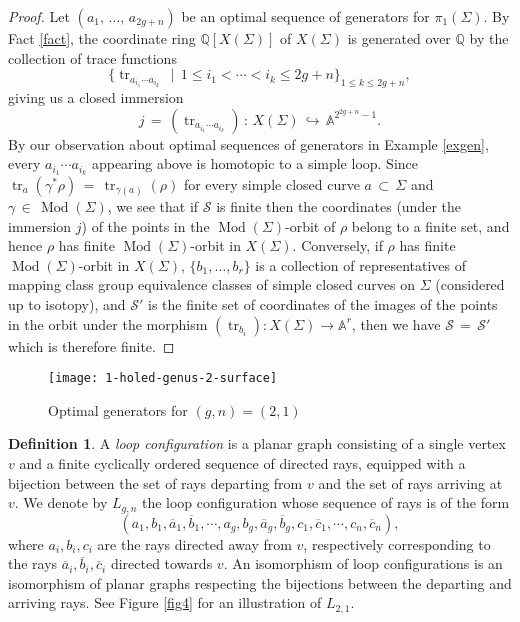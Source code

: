 \documentclass[reqno]{amsart}
\theoremstyle{plain}
\theoremstyle{definition}
\newtheorem{definition}[theorem]{Definition}
\theoremstyle{remark}
\newcommand{\A}{{\mathbb{A}}}
\newcommand{\Q}{{\mathbb{Q}}}
\newcommand{\Scal}{{\mathcal{S}}}
\DeclareMathOperator{\Mod}{Mod}
\DeclareMathOperator{\tr}{tr}
\begin{document}
\begin{proof}
Let $(a_1,\,\dots,\,a_{2g+n})$ be an optimal sequence of generators for $\pi_1(\Sigma)$. By Fact \ref{fact}, the
coordinate ring $\Q[X(\Sigma)]$ of $X(\Sigma)$ is generated over $\Q$ by the collection of trace functions
$$\{\tr_{a_{i_1}\cdots a_{i_k}}\,\mid\,1\leq i_1<\cdots<i_k\leq 2g+n\}_{1\leq k\leq 2g+n},$$
giving us a closed immersion
$$j\,=\,(\tr_{a_{i_1}\cdots a_{i_k}})\,:\,X(\Sigma)\,\hookrightarrow\,\A^{2^{2g+n}-1}.$$
By our observation about optimal sequences of generators in Example \ref{exgen}, every $a_{i_1}\cdots a_{i_k}$
appearing above is homotopic to a simple loop. Since $\tr_a(\gamma^*\rho)\,=\,\tr_{\gamma(a)}(\rho)$ for
every simple closed curve $a\,\subset\,\Sigma$ and $\gamma\,\in\,\Mod(\Sigma)$, we see that if $\Scal$ is
finite then the coordinates (under the immersion $j$) of the points in the $\Mod(\Sigma)$-orbit of $\rho$
belong to a finite set, and hence $\rho$ has finite $\Mod(\Sigma)$-orbit in $X(\Sigma)$. Conversely, if
$\rho$ has finite $\Mod(\Sigma)$-orbit in $X(\Sigma)$, $\{b_1,\dots,b_r\}$ is a collection of representatives of mapping class group equivalence classes of simple closed curves on $\Sigma$ (considered up to isotopy), and $\Scal'$ is the finite set of coordinates
of the images of the points in the orbit under the morphism $(\tr_{b_i}):X(\Sigma)\to\A^r$, then we have $\Scal\,=\,\Scal'$ which is therefore finite.
\end{proof}

\begin{figure}[ht]
    \centering
    \texttt{[image: 1-holed-genus-2-surface]}
    \caption{Optimal generators for $(g,n)=(2,1)$}
    \label{fig1}
\end{figure}

\begin{definition}
A \emph{loop configuration} is a planar graph consisting of a single vertex $v$ and a finite cyclically ordered sequence of directed rays, equipped with a bijection between the set of rays departing from $v$ and the set of rays arriving at $v$. We denote by $L_{g,n}$ the loop configuration whose sequence of rays is of the form
$$(a_1,b_1,\overline{a}_1,\overline{b}_1,\cdots,a_g,b_g,\overline{a}_g,\overline{b}_g,c_1,
\overline{c}_1,\cdots,c_n,\overline{c}_n),$$
where $a_i,b_i,c_i$ are the rays directed away from $v$, respectively corresponding to the rays
$\overline{a}_i,\overline{b}_i, \overline{c}_i$ directed towards $v$. An isomorphism of loop configurations is an isomorphism of planar graphs respecting the bijections between the departing and arriving rays. See Figure \ref{fig4} for an illustration of $L_{2,1}$.
\end{definition}
\end{document}
